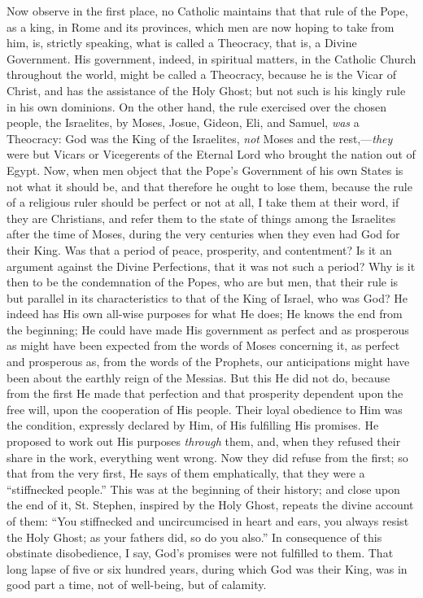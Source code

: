 Now observe in the first place, no Catholic maintains
that that rule of the Pope, as a king, in Rome and its
provinces, which men are now hoping to take from him, is,
strictly speaking, what is called a Theocracy, that is, a
Divine Government. His government, indeed, in spiritual
matters, in the Catholic Church throughout the world,
might be called a Theocracy, because he is the Vicar of
Christ, and has the assistance of the Holy Ghost; but not
such is his kingly rule in his own dominions. On the
other hand, the rule exercised over the chosen people,
the Israelites, by Moses, Josue, Gideon, Eli, and Samuel,
\emph{was} a Theocracy: God was the King of the
Israelites, \emph{not} Moses and the rest,—\emph{they}
were but Vicars or Vicegerents of the Eternal Lord who
brought the nation out of Egypt. Now, when men object
that the Pope's Government of his own States is not what
it should be, and that therefore he ought to lose them,
because the rule of a religious ruler should be perfect
or not at all, I take them at their word, if they are
Christians, and refer them to the state of things among
the Israelites after the time of Moses, during the very
centuries when they even had God for their King. Was that
a period of peace, prosperity, and contentment? Is it an
argument against the Divine Perfections, that it was not
such a period? Why is it then to be the condemnation of
the Popes, who are but men, that their rule is but
parallel in its characteristics to that of the King of
Israel, who was God? He indeed has His own all-wise
purposes for what He does; He knows the end from the
beginning; He could have made His government as perfect
and as prosperous as might have been expected from the
words of Moses concerning it, as perfect and prosperous
as, from the words of the Prophets, our anticipations
might have been about the earthly reign of the Messias.
But this He did not do, because from the first He made
that perfection and that prosperity dependent upon the
free will, upon the cooperation of His people. Their
loyal obedience to Him was the condition, expressly
declared by Him, of His fulfilling His promises. He
proposed to work out His purposes \emph{through} them,
and, when they refused their share in the work,
everything went wrong. Now they did refuse from the
first; so that from the very first, He says of them
emphatically, that they were a ``stiffnecked
people.'' This was at the beginning of their history;
and close upon the end of it, St. Stephen, inspired by
the Holy Ghost, repeats the divine account of them:
``You stiffnecked and uncircumcised in heart and
ears, you always resist the Holy Ghost; as your fathers
did, so do you also.'' In consequence of this
obstinate disobedience, I say, God's promises were not
fulfilled to them. That long lapse of five or six hundred
years, during which God was their King, was in good part
a time, not of well-being, but of calamity.

